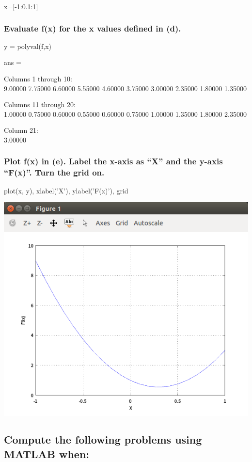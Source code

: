 \documentclass[12pt,a4paper]{article}
\begin{document}
x=[-1:0.1:1]

\subsubsection{Evaluate f(x) for the x values defined in (d).} 

y = polyval(f,x)

ans =

Columns 1 through 10:\\
9.00000   7.75000   6.60000   5.55000   4.60000   3.75000   3.00000   2.35000   1.80000   1.35000

Columns 11 through 20:\\
1.00000   0.75000   0.60000   0.55000   0.60000   0.75000   1.00000   1.35000   1.80000   2.35000

Column 21:\\
3.00000

\subsubsection{Plot f(x) in (e).  Label the x-axis as “X” and the y-axis “F(x)”.  Turn the grid on.} 
plot(x, y), xlabel('X'), ylabel('F(x)'), grid

\includegraphics[width=\textwidth]{1.png}


\subsection{Compute the following problems using MATLAB when:} 
\end{document}
